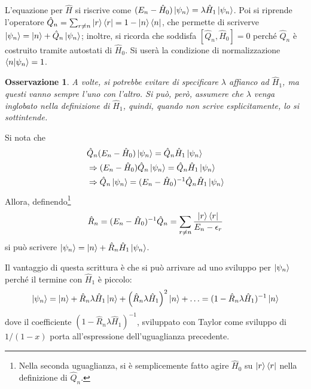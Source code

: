 \documentclass[11pt, a4paper]{scrartcl} %
\numberwithin{equation}{subsection}
\theoremstyle{style2}
\newtheorem{osservazione}{Osservazione}[section]
\theoremstyle{style1}
\begin{document}
L'equazione per $\hat{H}$ si riscrive come $(E_n - \hat{H}_0) \ket{\psi _n} = \lambda \hat{H}_1 \ket{\psi _n} $.
Poi si riprende l'operatore $\hat{Q}_n = \sum_{r\neq n}^{} \ket{r} \bra{r} = 1 - \ket{n} \bra{n} $, che permette di scriverve $\ket{\psi _n} = \ket{n} + \hat{Q}_n  \ket{\psi _n} $; inoltre, si ricorda che soddisfa $[\hat{Q}_n, \hat{H}_0] =0 $ perch\'e $\hat{Q}_n$ \`e costruito tramite autostati di $\hat{H}_0$.
Si user\`a la condizione di normalizzazione $\braket{n|\psi _n} =1 $.
\begin{osservazione}
A volte, si potrebbe evitare di specificare $\lambda $ affianco ad $\hat{H}_1$, ma questi vanno sempre l'uno con l'altro. 
Si pu\`o, per\`o, assumere che $\lambda $ venga inglobato nella definizione di $\hat{H}_1$, quindi, quando non scrive esplicitamente, lo si sottintende.
\end{osservazione}
Si nota che
\[
\begin{split}
	&\hat{Q}_n (E_n - \hat{H}_0) \ket{\psi _n} = \hat{Q}_n \hat{H}_1 \ket{\psi _n} \\
	&\Rightarrow (E_n-\hat{H}_0) \hat{Q}_n \ket{\psi _n} = \hat{Q}_n \hat{H}_1 \ket{\psi _n} \\
	&\Rightarrow \hat{Q}_n \ket{\psi _n} = (E_n -\hat{H}_0)^{-1} \hat{Q}_n \hat{H}_1 \ket{\psi _n} 
\end{split}
\] 
Allora, definendo\footnote{Nella seconda uguaglianza, si \`e semplicemente fatto agire $\hat{H}_0$ su $\ket{r} \bra{r} $ nella definizione di $\hat{Q}_n$.}
\[
\hat{R}_n = (E_n - \hat{H}_0) ^{-1} \hat{Q}_n = \sum_{r\neq n}^{} \frac{\ket{r} \bra{r} }{E_n - \epsilon _r}
\] 
si pu\`o scrivere $\ket{\psi _n }  = \ket{n} +\hat{R}_n \hat{H}_1 \ket{\psi _n} $.

Il vantaggio di questa scrittura \`e che si pu\`o arrivare ad uno sviluppo per $\ket{\psi _n} $ perch\'e il termine con $\hat{H}_1$ \`e piccolo:
\begin{equation}
	\ket{\psi _n} = \ket{n} + \hat{R}_n \lambda \hat{H}_1\ket{n}  + \left(\hat{R}_n \lambda \hat{H}_1\right) ^2 \ket{n} + \ldots = (1- \hat{R}_n \lambda \hat{H}_1)^{-1} \ket{n} 
\end{equation}
dove il coefficiente $(1-\hat{R}_n \lambda \hat{H}_1) ^{-1} $, sviluppato con Taylor come sviluppo di $1 / (1-x)$ porta all'espressione dell'uguaglianza precedente.
\end{document}
